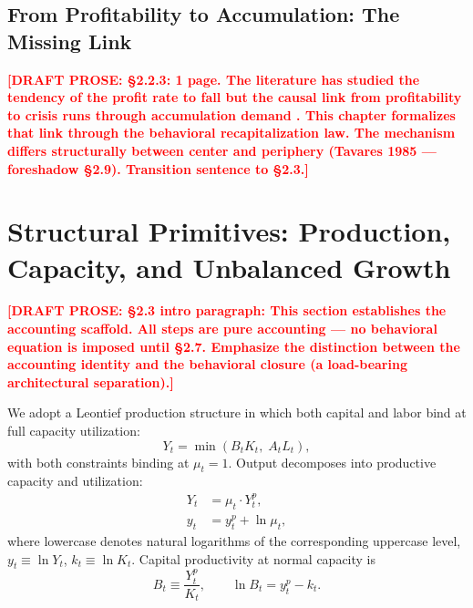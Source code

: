 \documentclass[12pt,letterpaper]{article}
\newcommand{\mut}{\mu_t}           %
\newcommand{\Yp}{Y^p_t}            %
\newcommand{\Bt}{B_t}              %
\newcommand{\draftnote}[1]{%
  \textcolor{red}{\textbf{[DRAFT PROSE: #1]}}}
\begin{document}
\subsection{From Profitability to Accumulation: The Missing Link}
\label{sec:missing_link}

\draftnote{§2.2.3: 1 page. The literature has studied the tendency of the
  profit rate to fall \citep{basu2012,basu2013} but the causal link from
  profitability to crisis runs through accumulation demand
  \citep{basu2017,ibarra2023,ibarra2024}. This chapter formalizes that link
  through the behavioral recapitalization law. The mechanism differs
  structurally between center and periphery (Tavares 1985 — foreshadow §2.9).
  Transition sentence to §2.3.}


\section{Structural Primitives: Production, Capacity,
  and Unbalanced Growth}
\label{sec:primitives}

\draftnote{§2.3 intro paragraph: This section establishes the accounting scaffold.
  All steps are pure accounting — no behavioral equation is imposed until §2.7.
  Emphasize the distinction between the accounting identity and the behavioral
  closure (a load-bearing architectural separation).}

We adopt a Leontief production structure in which both capital and labor bind
at full capacity utilization:
\begin{equation}
  Y_t = \min\!\left(B_t K_t,\; A_t L_t\right),
  \label{eq:leontief}
\end{equation}
with both constraints binding at $\mut = 1$. Output decomposes into
productive capacity and utilization:
\begin{align}
  Y_t &= \mut \cdot \Yp, \label{eq:decomp}\\
  y_t &= y^p_t + \ln\mut, \label{eq:decomp_log}
\end{align}
where lowercase denotes natural logarithms of the corresponding uppercase
level, $y_t \equiv \ln Y_t$, $k_t \equiv \ln K_t$.
Capital productivity at normal capacity is
\begin{equation}
  \Bt \equiv \frac{\Yp}{K_t},
  \qquad
  \ln \Bt = y^p_t - k_t.
  \label{eq:caprod}
\end{equation}
\end{document}
